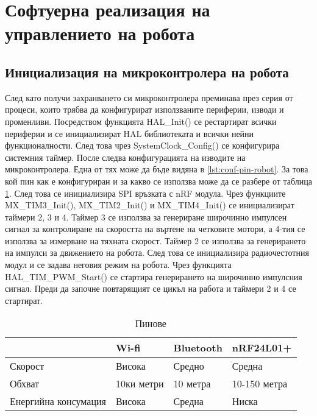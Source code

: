 \section{Софтуерна реализация на управлението на робота}
\label{sec:software-robot}


\subsection{Инициализация на микроконтролера на робота}
\label{ssec:init-robot}

След като получи захранването си микроконтролера преминава през серия от процеси, които трябва да конфигурират използваните периферии, изводи и променливи. Посредством функцията HAL\_Init() се рестартират всички периферии и се инициализират HAL библиотеката и всички нейни функционалности. След това чрез SystemClock\_Config() се конфигурира системния таймер. После следва конфигурацията на изводите на микроконтролера. Една от тях може да бъде видяна в \autoref{lst:conf-pin-robot}. За това кой пин как е конфигуриран и за какво се използва може да се разбере от таблица \cref{table:pins-robot}. След това се инициализира SPI връзката с nRF модула. Чрез функциите MX\_TIM3\_Init(), MX\_TIM2\_Init() и MX\_TIM4\_Init() се инициализират таймери 2, 3 и 4. Таймер 3 се използва за генериране широчинно импулсен сигнал за контролиране на скоростта на въртене на четковите мотори, а 4-тия се използва за измерване на тяхната скорост. Таймер 2 се използва за генерирането на импулси за движението на робота. След това се инициализира радиочестотния модул и се задава неговия режим на робота. Чрез функцията HAL\_TIM\_PWM\_Start() се стартира генерирането на широчинно импулсния сигнал. Преди да започне повтарящият се цикъл на работа и таймери 2 и 4 се стартират.



\begin{table}[H]
    \centering
    \begin{tabular}{| m{4cm} | m{} | m{} | m{} |}
        \hline
        & Wi-fi & Bluetooth & nRF24L01+ \\
        \hline
        Скорост &  Висока & Средно & Средна \\
        \hline
        Обхват & 10ки метри & 10 метра & 10-150 метра \\
        \hline
        Енергийна консумация & Висока & Средна & Ниска\\
        \hline
    \end{tabular}
    \caption{Пинове}
    \label{table:pins-robot}
\end{table}

